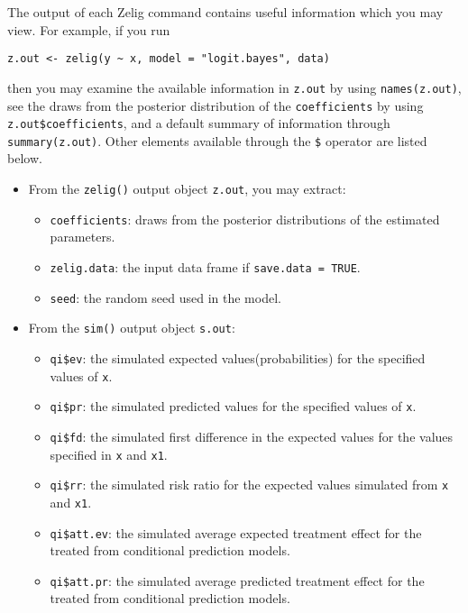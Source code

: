 The output of each Zelig command contains useful information which you may
view. For example, if you run
\begin{verbatim}
z.out <- zelig(y ~ x, model = "logit.bayes", data)
\end{verbatim}

\noindent then you may examine the available information in \texttt{z.out} by
using \texttt{names(z.out)}, see the draws from the posterior distribution of
the \texttt{coefficients} by using \texttt{z.out\$coefficients}, and a default
summary of information through \texttt{summary(z.out)}. Other elements
available through the \texttt{\$} operator are listed below.

\begin{itemize}
\item From the \texttt{zelig()} output object \texttt{z.out}, you may extract:

\begin{itemize}
\item \texttt{coefficients}: draws from the posterior distributions
of the estimated parameters.
   \item {\tt zelig.data}: the input data frame if {\tt save.data = TRUE}.  
\item \texttt{seed}: the random seed used in the model.

\end{itemize}

\item From the \texttt{sim()} output object \texttt{s.out}:

\begin{itemize}
\item \texttt{qi\$ev}: the simulated expected values(probabilities) for the specified
values of \texttt{x}.

\item \texttt{qi\$pr}: the simulated predicted values for the specified values
of \texttt{x}.

\item \texttt{qi\$fd}: the simulated first difference in the expected
values for the values specified in \texttt{x} and \texttt{x1}.

\item \texttt{qi\$rr}: the simulated risk ratio for the expected values
simulated from \texttt{x} and \texttt{x1}.

\item \texttt{qi\$att.ev}: the simulated average expected treatment effect
for the treated from conditional prediction models.

\item \texttt{qi\$att.pr}: the simulated average predicted treatment effect
for the treated from conditional prediction models.
\end{itemize}
\end{itemize}



